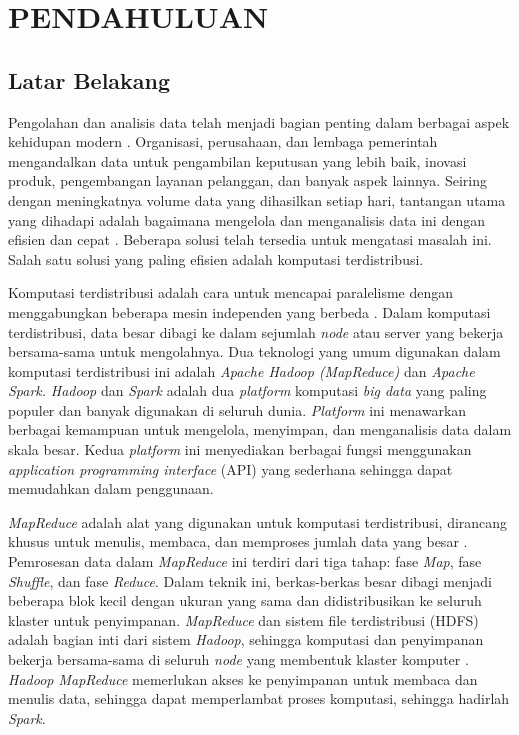 \chapter{PENDAHULUAN}
\section{Latar Belakang}

Pengolahan dan analisis data telah menjadi bagian penting dalam berbagai aspek kehidupan modern \cite{vermaBigDataManagement2016}. Organisasi, perusahaan, dan lembaga pemerintah mengandalkan data untuk pengambilan keputusan yang lebih baik, inovasi produk, pengembangan layanan pelanggan, dan banyak aspek lainnya. Seiring dengan meningkatnya volume data yang dihasilkan setiap hari, tantangan utama yang dihadapi adalah bagaimana mengelola dan menganalisis data ini dengan efisien dan cepat \cite{ahmadvandGapproxUsingGallup2019}. Beberapa solusi telah tersedia untuk mengatasi masalah ini. Salah satu solusi yang paling efisien adalah komputasi terdistribusi. 

Komputasi terdistribusi adalah cara untuk mencapai paralelisme dengan menggabungkan beberapa mesin independen yang berbeda \cite{bhattacharyaEvaluatingDistributedComputing2021}. Dalam komputasi terdistribusi, data besar dibagi ke dalam sejumlah \textit{node} atau server yang bekerja bersama-sama untuk mengolahnya. Dua teknologi yang umum digunakan dalam komputasi terdistribusi ini adalah \textit{Apache Hadoop (MapReduce)} dan \textit{Apache Spark.} \textit{Hadoop} dan \textit{Spark} adalah dua \textit{platform} komputasi \textit{big data} yang paling populer dan banyak digunakan di seluruh dunia. \textit{Platform} ini menawarkan berbagai kemampuan untuk mengelola, menyimpan, dan menganalisis data dalam skala besar. Kedua \textit{platform} ini menyediakan berbagai fungsi menggunakan \textit{application programming interface} (API) yang sederhana sehingga dapat memudahkan dalam penggunaan.

\textit{MapReduce} adalah alat yang digunakan untuk komputasi terdistribusi, dirancang khusus untuk menulis, membaca, dan memproses jumlah data yang besar \cite{deanMapReduceSimplifiedData2004}. Pemrosesan data dalam \textit{MapReduce} ini terdiri dari tiga tahap: fase \textit{Map}, fase \textit{Shuffle}, dan fase \textit{Reduce}. Dalam teknik ini, berkas-berkas besar dibagi menjadi beberapa blok kecil dengan ukuran yang sama dan didistribusikan ke seluruh klaster untuk penyimpanan. \textit{MapReduce} dan sistem file terdistribusi (HDFS) adalah bagian inti dari sistem \textit{Hadoop}, sehingga komputasi dan penyimpanan bekerja bersama-sama di seluruh \textit{node} yang membentuk klaster komputer \cite{samadiComparativeStudyHadoop2016}. \textit{Hadoop MapReduce} memerlukan akses ke penyimpanan untuk membaca dan menulis data, sehingga dapat memperlambat proses komputasi, sehingga hadirlah \textit{Spark}.

